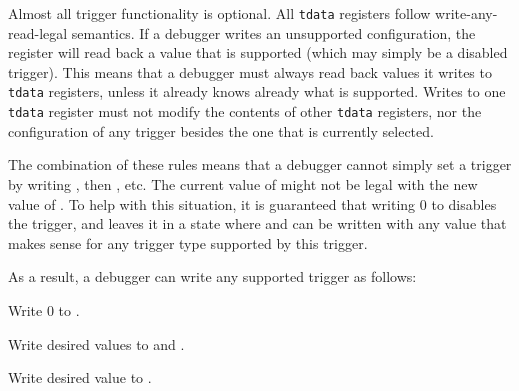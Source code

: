 Almost all trigger functionality is optional. All {\tt tdata} registers follow
write-any-read-legal semantics. If a debugger writes an unsupported
configuration, the register will read back a value that is supported (which may
simply be a disabled trigger).  This means that a debugger must always read
back values it writes to {\tt tdata} registers, unless it already knows already
what is
supported.  Writes to one {\tt tdata} register must not modify the contents of
other {\tt tdata} registers, nor the configuration of any trigger besides the
one that is currently selected.

The combination of these rules means that a debugger cannot simply set a
trigger by writing \RcsrTdataOne, then \RcsrTdataTwo, etc. The current value
of \RcsrTdataTwo might not be legal with the new value of \RcsrTdataOne. To
help with this situation, it is guaranteed that writing 0 to \RcsrTdataOne
disables the trigger, and leaves it in a state where \RcsrTdataTwo and
\RcsrTdataThree can be written with any value that makes sense for any
trigger type supported by this trigger.

\begin{steps}{As a result, a debugger can write any supported trigger as
follows:}
\item Write 0 to \RcsrTdataOne.
\item Write desired values to \RcsrTdataTwo and \RcsrTdataThree.
\item Write desired value to \RcsrTdataOne.
\end{steps}


